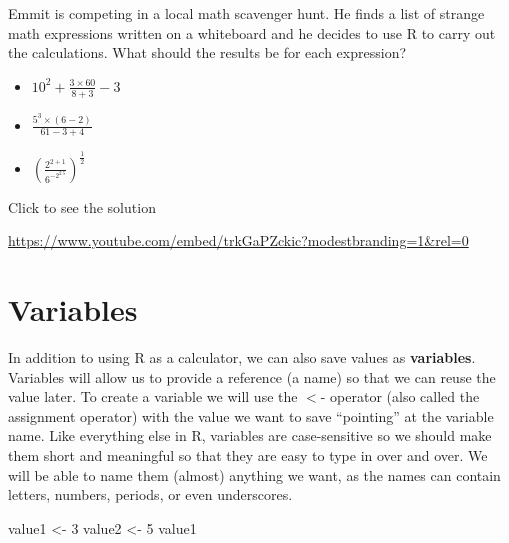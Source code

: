 \documentclass[
  letterpaper,
  DIV=11,
  numbers=noendperiod]{scrreprt}
\newenvironment{Shaded}{\begin{snugshade}}{\end{snugshade}}
\newcommand{\DecValTok}[1]{\textcolor[rgb]{0.68,0.00,0.00}{#1}}
\newcommand{\NormalTok}[1]{\textcolor[rgb]{0.00,0.23,0.31}{#1}}
\newcommand{\OtherTok}[1]{\textcolor[rgb]{0.00,0.23,0.31}{#1}}
\providecommand{\tightlist}{%
  \setlength{\itemsep}{0pt}\setlength{\parskip}{0pt}}
\begin{document}
\begin{tcolorbox}[enhanced jigsaw, leftrule=.75mm, arc=.35mm, coltitle=black, rightrule=.15mm, bottomrule=.15mm, toprule=.15mm, left=2mm, colbacktitle=quarto-callout-tip-color!10!white, title=\textcolor{quarto-callout-tip-color}{\faLightbulb}\hspace{0.5em}{Try it Out}, toptitle=1mm, breakable, colframe=quarto-callout-tip-color-frame, bottomtitle=1mm, titlerule=0mm, colback=white, opacityback=0, opacitybacktitle=0.6]

Emmit is competing in a local math scavenger hunt. He finds a list of
strange math expressions written on a whiteboard and he decides to use R
to carry out the calculations. What should the results be for each
expression?

\begin{itemize}
\tightlist
\item
  \(\displaystyle 10^2 + \frac{3\times 60}{8 + 3} - 3\)
\item
  \(\displaystyle \frac{5^3\times(6-2)}{61-3+4}\)
\item
  \(\displaystyle \left(\frac{2^{2+1}}{6^{-2^{2.5}}}\right)^\frac{1}{2}\)
\end{itemize}

Click to see the solution

\url{https://www.youtube.com/embed/trkGaPZckic?modestbranding=1&rel=0}

\end{tcolorbox}

\section{Variables}\label{variables}

In addition to using R as a calculator, we can also save values as
\textbf{variables}. Variables will allow us to provide a reference (a
name) so that we can reuse the value later. To create a variable we will
use the \(<\)- operator (also called the assignment operator) with the
value we want to save ``pointing'' at the variable name. Like everything
else in R, variables are case-sensitive so we should make them short and
meaningful so that they are easy to type in over and over. We will be
able to name them (almost) anything we want, as the names can contain
letters, numbers, periods, or even underscores.

\begin{Shaded}
\begin{Highlighting}[]
\NormalTok{value1 }\OtherTok{\textless{}{-}} \DecValTok{3}
\NormalTok{value2 }\OtherTok{\textless{}{-}} \DecValTok{5}
\NormalTok{value1}
\end{Highlighting}
\end{Shaded}
\end{document}
